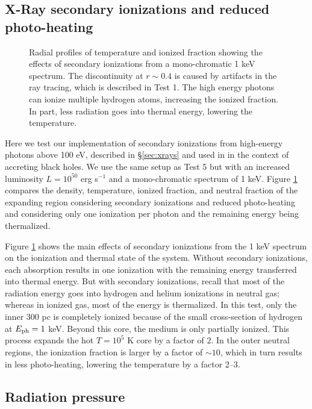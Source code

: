 \documentclass[useAMS,usenatbib]{mn2e}
\begin{document}
\subsection{X-Ray secondary ionizations and reduced photo-heating}

\begin{figure}
  \caption{\label{fig:xray_fig} Radial profiles of temperature and
    ionized fraction showing the effects of secondary ionizations from
    a mono-chromatic 1 keV spectrum.  The discontinuity at $r \sim
    0.4$ is caused by artifacts in the ray tracing, which is described
    in Test 1.  The high energy photons can ionize multiple hydrogen
    atoms, increasing the ionized fraction.  In part, less radiation
    goes into thermal energy, lowering the temperature.}
\end{figure}

Here we test our implementation of secondary ionizations from
high-energy photons above 100 eV, described in \S\ref{sec:xrays} and
used in \citet{Alvarez09} in the context of accreting black holes.  We
use the same setup as Test 5 but with an increased luminosity $L =
10^{50}$ erg s$^{-1}$ and a mono-chromatic spectrum of 1 keV.  Figure
\ref{fig:xray_fig} compares the density, temperature, ionized
fraction, and neutral fraction of the expanding \hii region
considering secondary ionizations and reduced photo-heating and
considering only one ionization per photon and the remaining energy
being thermalized.

Figure \ref{fig:xray_fig} shows the main effects of secondary
ionizations from the 1 keV spectrum on the ionization and thermal
state of the system.  Without secondary ionizations, each absorption
results in one ionization with the remaining energy transferred into
thermal energy.  But with secondary ionizations, recall that most of
the radiation energy goes into hydrogen and helium ionizations in
neutral gas; whereas in ionized gas, most of the energy is
thermalized.  In this test, only the inner 300 pc is completely
ionized because of the small cross-section of hydrogen at $E_{\rm ph}
= 1$ keV.  Beyond this core, the medium is only partially ionized.
This process expands the hot $T = 10^5$ K core by a factor of 2.  In
the outer neutral regions, the ionization fraction is larger by a
factor of $\sim 10$, which in turn results in less photo-heating,
lowering the temperature by a factor 2--3.

\subsection{Radiation pressure}
\end{document}
